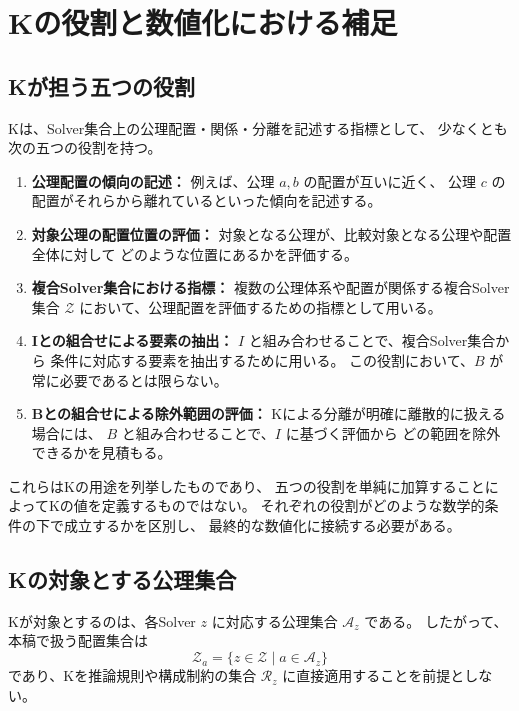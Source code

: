 \documentclass[a4paper,12pt]{article}
\begin{document}
\section{Kの役割と数値化における補足}

\subsection{Kが担う五つの役割}

Kは、Solver集合上の公理配置・関係・分離を記述する指標として、
少なくとも次の五つの役割を持つ。

\begin{enumerate}[label=(\arabic*)]
    \item \textbf{公理配置の傾向の記述：}
    例えば、公理 $a,b$ の配置が互いに近く、
    公理 $c$ の配置がそれらから離れているといった傾向を記述する。

    \item \textbf{対象公理の配置位置の評価：}
    対象となる公理が、比較対象となる公理や配置全体に対して
    どのような位置にあるかを評価する。

    \item \textbf{複合Solver集合における指標：}
    複数の公理体系や配置が関係する複合Solver集合
    $\mathcal{Z}$ において、公理配置を評価するための指標として用いる。

    \item \textbf{Iとの組合せによる要素の抽出：}
    $I$ と組み合わせることで、複合Solver集合から
    条件に対応する要素を抽出するために用いる。
    この役割において、$B$ が常に必要であるとは限らない。

    \item \textbf{Bとの組合せによる除外範囲の評価：}
    Kによる分離が明確に離散的に扱える場合には、
    $B$ と組み合わせることで、$I$ に基づく評価から
    どの範囲を除外できるかを見積もる。
\end{enumerate}

これらはKの用途を列挙したものであり、
五つの役割を単純に加算することによってKの値を定義するものではない。
それぞれの役割がどのような数学的条件の下で成立するかを区別し、
最終的な数値化に接続する必要がある。

\subsection{Kの対象とする公理集合}

Kが対象とするのは、各Solver $z$ に対応する公理集合
$\mathcal{A}_z$ である。
したがって、本稿で扱う配置集合は
\[
    \mathcal{Z}_a
    =
    \{z\in\mathcal{Z}\mid a\in\mathcal{A}_z\}
\]
であり、Kを推論規則や構成制約の集合
$\mathcal{R}_z$ に直接適用することを前提としない。
\end{document}
